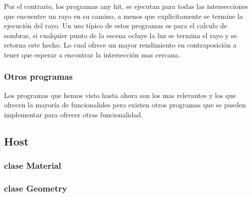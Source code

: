 Por el contrario, los programas any hit, se ejecutan para todas las intersecciones que encuentre un rayo en su camino, a menos que explicitamente se termine la ejecución del rayo.
Un uso típico de estos programas es para el calculo de sombras, si cualquier punto de la escena ocluye la luz se termina el rayo y se retorna este hecho. Lo cual ofrece un mayor rendimiento en contraposición a tener que esperar a encontrar la intersección mas cercana.

\subsubsection{Otros programas}

Los programas que hemos visto hasta ahora son los mas relevantes y los que ofrecen la mayoría de funcionalides pero existen otros programas que se pueden implementar para ofrecer otras funcionalidad.

\subsection{Host}

\subsubsection{clase Material}

\subsubsection{clase Geometry}



